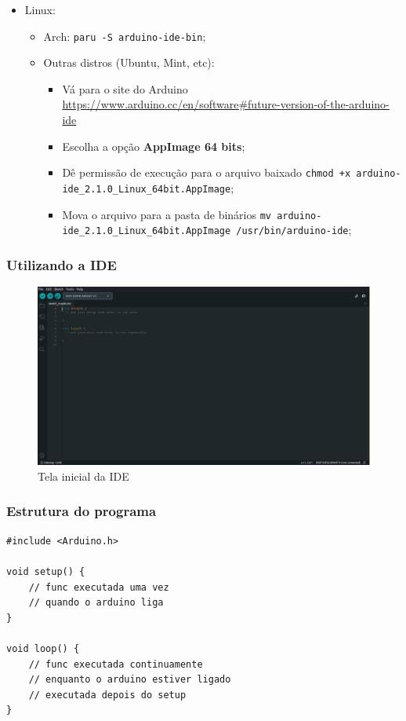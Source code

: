 \documentclass[12pt]{beamer}
\begin{document}
\begin{frame}[allowframebreaks]
\begin{itemize}
        \framebreak%
        \item Linux:
        \begin{itemize}
            \item Arch: \texttt{paru -S arduino-ide-bin};
            \item Outras distros (Ubuntu, Mint, etc):
            \begin{itemize}
                \item Vá para o site do Arduino \url{https://www.arduino.cc/en/software\#future-version-of-the-arduino-ide}
                \item Escolha a opção \textbf{AppImage 64 bits};
                \item Dê permissão de execução para o arquivo baixado \texttt{chmod +x arduino-ide_2.1.0_Linux_64bit.AppImage};
                \item Mova o arquivo para a pasta de binários \texttt{mv arduino-ide_2.1.0_Linux_64bit.AppImage /usr/bin/arduino-ide};
            \end{itemize}
        \end{itemize}
    \end{itemize}
\end{frame}

\begin{frame}
    \frametitle{Utilizando a IDE}

    \begin{figure}
        \centering
        \includegraphics[height=.68\textheight]{ide}
        \caption{Tela inicial da IDE}
    \end{figure}

\end{frame}

\begin{frame}[t,fragile]
    \frametitle{Estrutura do programa}
    \begin{lstlisting}
#include <Arduino.h>

void setup() {
    // func executada uma vez
    // quando o arduino liga
}

void loop() {
    // func executada continuamente
    // enquanto o arduino estiver ligado
    // executada depois do setup
}
    \end{lstlisting}
\end{frame}
\end{document}
